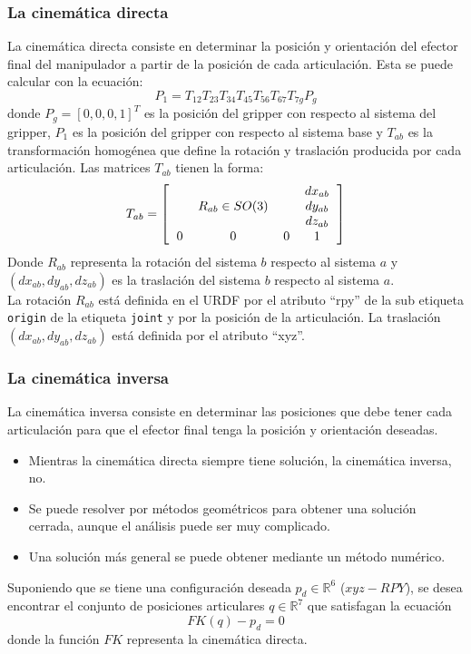 \begin{frame}\frametitle{La cinemática directa}
  La cinemática directa consiste en determinar la posición y orientación del efector final del manipulador a partir de la posición de cada articulación.  Esta se puede calcular con la ecuación:
  \[P_1 = T_{12}T_{23}T_{34}T_{45}T_{56}T_{67}T_{7g}P_g\]
  donde $P_g = [0,0,0,1]^T$ es la posición del gripper con respecto al sistema del gripper, $P_1$ es la posición del gripper con respecto al sistema base y $T_{ab}$ es la transformación homogénea que define la rotación y traslación producida por cada articulación. Las matrices $T_{ab}$
  tienen la forma:
  \[T_{ab} = \left[\begin{tabular}{cccc}
      & & & $dx_{ab}$\\
      & $R_{ab}\in SO(3)$ & & $dy_{ab}$\\
      & & & $dz_{ab}$\\
      0 & 0& 0 & 1
    \end{tabular}\right]\]
  Donde $R_{ab}$ representa la rotación del sistema $b$ respecto al sistema $a$ y $(dx_{ab}, dy_{ab}, dz_{ab})$ es la traslación del sistema $b$ respecto al sistema $a$.\\
  La rotación $R_{ab}$ está definida en el URDF por el atributo ``rpy'' de la sub etiqueta \texttt{origin} de la etiqueta \texttt{joint} y por la posición de la articulación. La traslación $(dx_{ab}, dy_{ab}, dz_{ab})$ está definida por el atributo ``xyz''. 
\end{frame}

\begin{frame}\frametitle{La cinemática inversa}
  La cinemática inversa consiste en determinar las posiciones que debe tener cada articulación para que el efector final tenga la posición y orientación deseadas.
  \begin{itemize}
  \item Mientras la cinemática directa siempre tiene solución, la cinemática inversa, no.
  \item Se puede resolver por métodos geométricos para obtener una solución cerrada, aunque el análisis puede ser muy complicado.
  \item Una solución más general se puede obtener mediante un método numérico. 
  \end{itemize}
  Suponiendo que se tiene una configuración deseada $p_d \in \mathbb{R}^6$ ($xyz-RPY$), se desea encontrar el conjunto de posiciones articulares $q\in\mathbb{R}^7$ que satisfagan la ecuación
  \[FK(q) - p_d = 0\]
  donde la función $FK$ representa la cinemática directa. 
\end{frame}

